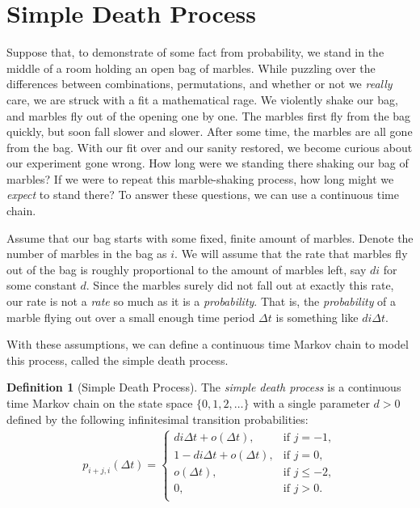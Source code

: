 \documentclass[12pt]{article}
\theoremstyle{definition}
\newtheorem{defn}{Definition}
\begin{document}
\section{Simple Death Process}
\label{sec:simple_death_process}

Suppose that, to demonstrate of some fact from probability, we stand in the
middle of a room holding an open bag of marbles. While puzzling over the
differences between combinations, permutations, and whether or not we
\emph{really} care, we are struck with a fit a mathematical rage. We violently
shake our bag, and marbles fly out of the opening one by one. The marbles first
fly from the bag quickly, but soon fall slower and slower.  After some time,
the marbles are all gone from the bag. With our fit over and our sanity
restored, we become curious about our experiment gone wrong. How long were we
standing there shaking our bag of marbles? If we were to repeat this
marble-shaking process, how long might we \emph{expect} to stand there? To
answer these questions, we can use a continuous time chain.

Assume that our bag starts with some fixed, finite amount of marbles. Denote
the number of marbles in the bag as $i$. We will assume that the rate that
marbles fly out of the bag is roughly proportional to the amount of marbles
left, say $di$ for some constant $d$. Since the marbles surely did not fall out
at exactly this rate, our rate is not a \emph{rate} so much as it is a
\emph{probability}.  That is, the \emph{probability} of a marble flying out
over a small enough time period $\Delta t$ is something like $di \Delta t$.

With these assumptions, we can define a continuous time Markov chain to model
this process, called the simple death process.

\begin{defn}[Simple Death Process]
The \emph{simple death process} is a continuous time Markov chain on the state
space $\{0, 1, 2, \dots\}$ with a single parameter $d > 0$ defined by the
following infinitesimal transition probabilities:
\begin{align*}
    p_{i + j, i}(\Delta t) =
    \begin{cases}
        di \Delta t + o(\Delta t), & \text{if } j = -1, \\
        1 - di \Delta t + o(\Delta t), & \text{if } j = 0, \\
        o(\Delta t), & \text{if } j \leq -2, \\
        0, & \text{if } j > 0. \\
    \end{cases}
\end{align*}
\end{defn}
\end{document}
